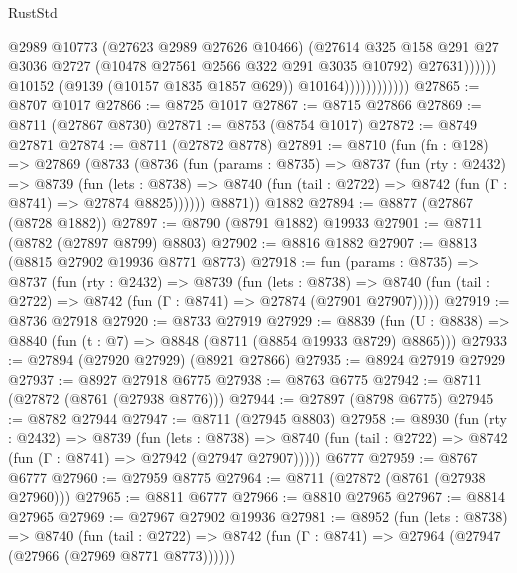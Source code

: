\begin{lexlean}{RustStd}
\begin{coremodule}
                                      @2989
                                      @10773
                                      (@27623 @2989 @27626 @10466)
                                      (@27614
                                        @325
                                        @158
                                        @291
                                        @27
                                        @3036
                                        @2727
                                        (@10478 @27561 @2566 @322 @291 @3035 @10792)
                                        @27631))))))
                            @10152
                            (@9139 (@10157 @1835 @1857 @629))
                            @10164))))))))))))
@27865 := @8707 @1017
@27866 := @8725 @1017
@27867 := @8715 @27866
@27869 := @8711 (@27867 @8730)
@27871 := @8753 (@8754 @1017)
@27872 := @8749 @27871
@27874 := @8711 (@27872 @8778)
@27891 := @8710
    (fun (fn : @128) =>
    @27869
      (@8733
        (@8736
          (fun (params : @8735) =>
          @8737
            (fun (rty : @2432) =>
            @8739
              (fun (lets : @8738) =>
              @8740 (fun (tail : @2722) => @8742 (fun (Γ : @8741) => @27874 @8825))))))
        @8871))
    @1882
@27894 := @8877 (@27867 (@8728 @1882))
@27897 := @8790 (@8791 @1882) @19933
@27901 := @8711 (@8782 (@27897 @8799) @8803)
@27902 := @8816 @1882
@27907 := @8813 (@8815 @27902 @19936 @8771 @8773)
@27918 := fun (params : @8735) =>
  @8737
    (fun (rty : @2432) =>
    @8739
      (fun (lets : @8738) =>
      @8740 (fun (tail : @2722) => @8742 (fun (Γ : @8741) => @27874 (@27901 @27907)))))
@27919 := @8736 @27918
@27920 := @8733 @27919
@27929 := @8839
    (fun (U : @8838) => @8840 (fun (t : @7) => @8848 (@8711 (@8854 @19933 @8729) @8865)))
@27933 := @27894 (@27920 @27929) (@8921 @27866)
@27935 := @8924 @27919 @27929
@27937 := @8927 @27918 @6775
@27938 := @8763 @6775
@27942 := @8711 (@27872 (@8761 (@27938 @8776)))
@27944 := @27897 (@8798 @6775)
@27945 := @8782 @27944
@27947 := @8711 (@27945 @8803)
@27958 := @8930
    (fun (rty : @2432) =>
    @8739
      (fun (lets : @8738) =>
      @8740 (fun (tail : @2722) => @8742 (fun (Γ : @8741) => @27942 (@27947 @27907)))))
    @6777
@27959 := @8767 @6777
@27960 := @27959 @8775
@27964 := @8711 (@27872 (@8761 (@27938 @27960)))
@27965 := @8811 @6777
@27966 := @8810 @27965
@27967 := @8814 @27965
@27969 := @27967 @27902 @19936
@27981 := @8952
    (fun (lets : @8738) =>
    @8740
      (fun (tail : @2722) =>
      @8742 (fun (Γ : @8741) => @27964 (@27947 (@27966 (@27969 @8771 @8773))))))

\end{coremodule}
\end{lexlean}
